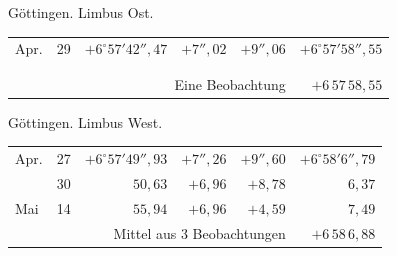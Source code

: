 \noindent\begin{minipage}[t]{.495\textwidth}\centering Göttingen. Limbus Ost.\par\smallskip
{\scriptsize\setlength{\tabcolsep}{1pt}\renewcommand{\arraystretch}{1.2}\begin{tabular}{lr|r|r|r|r|}
Apr.&29&$+6^\circ57'42''{,}47$&$+7''{,}02$&$+9''{,}06$&$+6^\circ57'58''{,}55$\\
&&&&&\\
&&&&&\\
\cline{6-6}\multicolumn{5}{r}{Eine Beobachtung}&$+6\,57\,58{,}55$
\end{tabular}}\end{minipage}\hfill\begin{minipage}[t]{.495\textwidth}\centering Göttingen. Limbus West.\par\smallskip
{\scriptsize\setlength{\tabcolsep}{1pt}\renewcommand{\arraystretch}{1.2}\begin{tabular}{lr|r|r|r|r}
Apr.&27&$+6^\circ57'49''{,}93$&$+7''{,}26$&$+9''{,}60$&$+6^\circ58'6''{,}79$\\
&30&$50{,}63$&$+6{,}96$&$+8{,}78$&$6{,}37$\\
Mai&14&$55{,}94$&$+6{,}96$&$+4{,}59$&$7{,}49$\\
\cline{6-6}\multicolumn{5}{r}{Mittel aus 3 Beobachtungen}&$+6\,58\,6{,}88$
\end{tabular}}\end{minipage}
\par\vspace{4mm}

